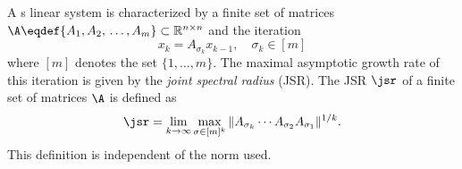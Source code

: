 A s\witch{} linear system is characterized by a finite set of matrices $\A \eqdef \{A_1, A_2,\\\ldots, A_m\} \subset \mathbb{R}^{n \times n}$ and the iteration
\begin{equation}
  \label{eq:switchsys}
  x_k = A_{\sigma_k} x_{k-1}, \quad \sigma_k \in [m]
\end{equation}
where $[m]$ denotes the set $\{1, \ldots, m\}$.
The maximal asymptotic growth rate of this iteration is given by the \emph{joint spectral radius} (JSR).
The JSR $\jsr$ of a finite set of matrices $\A$
is defined as
\[ \jsr = \lim_{k \to \infty} \max_{\sigma \in [m]^k} \|A_{\sigma_k} \cdots A_{\sigma_2} A_{\sigma_1}\|^{1/k}. \]
This definition is independent of the norm used.

